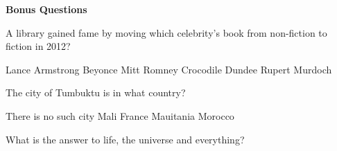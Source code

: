 \documentclass[10pt,answers,addpoints]{exam}
\begin{document}
\begin{questions}
\begin{minipage}{\linewidth}
\end{minipage}





\newpage
\begin{center}
{\Large \textbf{Bonus Questions}}
\end{center}

\par\vspace{0.100000in}\begin{minipage}{\linewidth}
\bonusquestion[2]
A library gained fame by moving which celebrity's book from non-fiction to fiction in 2012?
\medskip
\begin{choices}
\choice Lance Armstrong
\choice Beyonce
\choice Mitt Romney
\choice Crocodile Dundee
\choice Rupert Murdoch
\end{choices}
\setlength\answerlinelength{1in}
\answerline[A]

\end{minipage}


\par\vspace{0.100000in}\begin{minipage}{\linewidth}
\bonusquestion[2]
The city of Tumbuktu is in what country?
\medskip
\begin{choices}
\choice There is no such city
\choice Mali
\choice France
\choice Mauitania
\choice Morocco
\end{choices}
\setlength\answerlinelength{1in}
\answerline[B]

\end{minipage}


\par\vspace{0.100000in}\begin{minipage}{\linewidth}
\vspace{.35cm}\bonusquestion[2]
What is the answer to life, the universe and everything?
\vspace{.25cm}\setlength\answerlinelength{3in}
\answerline[42]
\end{minipage}





\end{questions}
\end{document}
